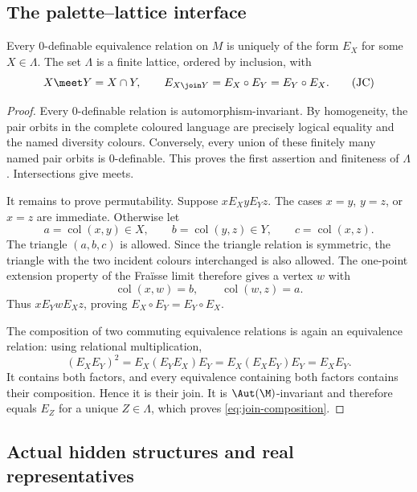 \subsection{The palette--lattice interface}

\begin{proposition}
\label{prop:lattice-interface}
Every \(0\)-definable equivalence relation on \(M\) is uniquely of the form
\(E_X\) for some \(X\in\Lambda\).  The set \(\Lambda\) is a finite lattice,
ordered by inclusion, with
\[
 X\meet Y=X\cap Y,
 \qquad
 E_{X\join Y}=E_X\circ E_Y=E_Y\circ E_X.
 \tag{JC}\label{eq:join-composition}
\]
\end{proposition}

\begin{proof}
Every \(0\)-definable relation is automorphism-invariant. By homogeneity,
the pair orbits in the complete coloured language are precisely logical
equality and the named diversity colours. Conversely, every union of these
finitely many named pair orbits is \(0\)-definable.  This proves the first assertion and finiteness of
\(\Lambda\).  Intersections give meets.

It remains to prove permutability.  Suppose
\(xE_XyE_Yz\).  The cases \(x=y\), \(y=z\), or \(x=z\) are immediate.  Otherwise let
\[
 a=\operatorname{col}(x,y)\in X,
 \qquad b=\operatorname{col}(y,z)\in Y,
 \qquad c=\operatorname{col}(x,z).
\]
The triangle \((a,b,c)\) is allowed.  Since the triangle relation is symmetric,
the triangle with the two incident colours interchanged is also allowed.
The one-point extension property of the Fra\"isse limit therefore gives a
vertex \(w\) with
\[
 \operatorname{col}(x,w)=b,
 \qquad
 \operatorname{col}(w,z)=a.
\]
Thus \(xE_YwE_Xz\), proving
\(E_X\circ E_Y=E_Y\circ E_X\).

The composition of two commuting equivalence relations is again an
equivalence relation: using relational multiplication,
\[
 (E_XE_Y)^2=E_X(E_YE_X)E_Y=E_X(E_XE_Y)E_Y=E_XE_Y.
\]
It contains both factors, and every equivalence containing both factors
contains their composition.  Hence it is their join.  It is
\(\Aut(\M)\)-invariant and therefore equals \(E_Z\) for a unique
\(Z\in\Lambda\), which proves \eqref{eq:join-composition}.
\end{proof}


\subsection{Actual hidden structures and real representatives}

